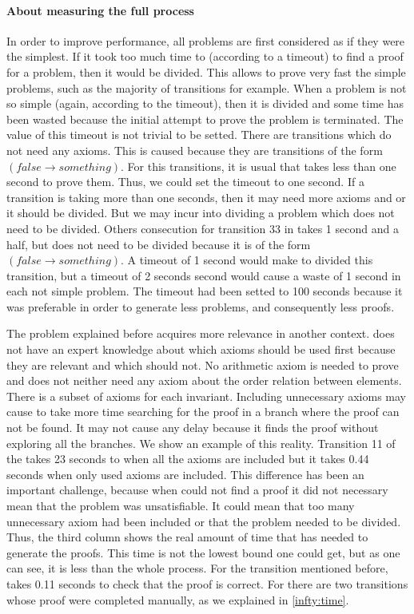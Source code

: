 \paragraph{About measuring the full process}
In order to improve performance, all \spass problems are first considered as if they were the simplest. 
%
If it took too much time to \spass (according to a timeout) to find a proof for a problem, then it would be divided.
%
This allows to prove very fast the simple problems, such as the majority of \invDisjoint transitions for example. 
%
When a problem is not so simple (again, according to the timeout), then it is divided and some time has been wasted because the initial attempt to prove the problem is terminated.
%
The value of this timeout is not trivial to be setted.
%
There are transitions which do not need any axioms. 
%
This is caused because they are transitions of the form $(false \to something)$.
%
For this transitions, it is usual that \spass takes less than one second to prove them. 
%
Thus, we could set the timeout to one second. 
%
If a transition is taking more than one seconds, then it may need more axioms and or it should be divided.
%
But we may incur into dividing a problem which does not need to be divided. 
%
Others consecution for transition 33 in \invLock takes 1 second and a half, but does not need to be divided because it is of the form $(false \to something)$.
%
A timeout of 1 second would make \gandalf to divided this transition, but a timeout of 2 seconds second would cause a waste of 1 second in each not simple \spass problem.
%
The timeout had been setted to 100 seconds because it was preferable in order to generate less \spass problems, and consequently less proofs.

The problem explained before acquires more relevance in another context.
%
\spass does not have an expert knowledge about which axioms should be used first because they are relevant and which should not.
%
No arithmetic axiom is needed to prove \invRegion and \spass does not neither need any axiom about the order relation between elements. 
%
There is a subset of axioms for each invariant.
%
Including unnecessary axioms may cause \spass to take more time searching for the proof in a branch where the proof can not be found. 
%
It may not cause any delay because it finds the proof without exploring all the branches.
%
We show an example of this reality.
%
Transition 11 of the \invPreserve takes 23 seconds to \spass when all the axioms are included but it takes 0.44 seconds when only used axioms are included. 
%
This difference has been an important challenge, because when \spass could not find a proof it did not necessary mean that the problem was unsatisfiable. 
%
It could mean that too many unnecessary axiom had been included or that the problem needed to be divided.
%
Thus, the third column shows the real amount of time that \spass has needed to generate the proofs. 
%
This time is not the lowest bound one could get, but as one can see, it is less than the whole process.
%
For the transition mentioned before, \spass takes 0.11 seconds to check that the proof is correct.
%
For \invPreserve there are two transitions whose proof were completed manually, as we explained in \ref{infty:time}.